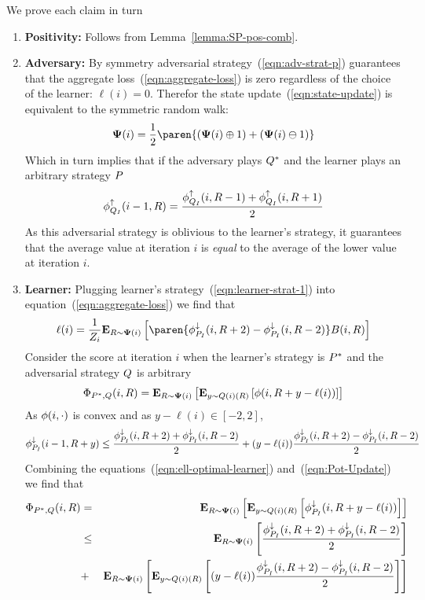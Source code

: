 \documentclass{article}[12pt]
\begin{document}
    We prove each claim in turn
\begin{enumerate}
\item {\bf Positivity:} Follows from Lemma~\ref{lemma:SP-pos-comb}.
\item{\bf Adversary:} By symmetry adversarial strategy~(\ref{eqn:adv-strat-p}) guarantees that
  the aggregate loss~(\ref{eqn:aggregate-loss}) is zero regardless of
  the choice of the learner: $\ell(i)=0$.
  Therefor the state update~(\ref{eqn:state-update}) is equivalent to
  the symmetric random walk:
  $$\state(i) = \frac{1}{2} \paren{(\state(i) \oplus 1) + (\state(i)
    \ominus 1)}$$
  Which in turn implies that if the adversary plays $Q^*$
  and the learner plays an arbitrary strategy $P$
  \begin{equation} \label{eqn:lower}
    \phi_{Q_I}^{\uparrow}(i-1,R) = \frac{\phi_{Q_I}^{\uparrow}(i,R-1)+\phi_{Q_I}^{\uparrow}(i,R+1)}{2}
  \end{equation}
  As this adversarial strategy is oblivious to the learner's strategy, it
  guarantees that the average value at iteration $i$ is {\em equal} to the
  average of the lower value at iteration $i$.
\item {\bf Learner:}
  Plugging learner's strategy~(\ref{eqn:learner-strat-1})
  into equation~(\ref{eqn:aggregate-loss}) we find that
 \begin{equation} \label{eqn:ell-optimal-learner}
   \ell(i) = \frac{1}{Z_{i}} \E{\R \sim \state(i)}{\paren{\upperpotb(i,\R+2)-\upperpotb(i,\R-2)}
   \Bias(i,\R)}
\end{equation}
  Consider the score at iteration $i$ when the learner's strategy
  is $P^*$ and the adversarial strategy  $Q$ is arbitrary
     \begin{equation} \label{eqn:Pot-Update}
    \Phi_{P^*,Q}(i,R) = {\bf E}_{R \sim {\bf \Psi}(i)}\left[  {\bf E}_{y \sim
      Q(i)(R)}\left[ \phi(i,R+y-\ell(i)) \right] \right]
  \end{equation}
  As $\phi(i,\cdot)$ is convex and as $y-\ell(i) \in [-2,2]$,
  \begin{equation} \label{eqn:pot-upper}
    \phi_{P_I}^{\downarrow}(i-1,R+y) \leq \frac{\phi_{P_I}^{\downarrow}(i,R+2)+\phi_{P_I}^{\downarrow}(i,R-2)}{2} +
    (y-\ell(i)) \frac{\phi_{P_I}^{\downarrow}(i,R+2)-\phi_{P_I}^{\downarrow}(i,R-2)}{2}
    \end{equation}
  Combining the equations~(\ref{eqn:ell-optimal-learner}) and~(\ref{eqn:Pot-Update}) we find that
  \begin{eqnarray}
  \Phi_{P^*,Q}(i,R)&=&{\bf E}_{R \sim {\bf \Psi}(i)}\left[ {\bf E}_{y \sim Q(i)(R)}\left[ \phi_{P_I}^{\downarrow}(i,R+y-\ell(i)) \right] \right]\\
  &\leq & {\bf E}_{R \sim {\bf \Psi}(i)}\left[ \frac{\phi_{P_I}^{\downarrow}(i,R+2)+\phi_{P_I}^{\downarrow}(i,R-2)}{2} \right]\\
  &+&
  {\bf E}_{R \sim {\bf \Psi}(i)}\left[ {\bf E}_{y \sim Q(i)(R)}\left[ (y-\ell(i)) \frac{\phi_{P_I}^{\downarrow}(i,R+2)-\phi_{P_I}^{\downarrow}(i,R-2)}{2} \right] \right] \label{eqn:zero-term}
  \end{eqnarray}
  

\end{enumerate}
\end{document}
